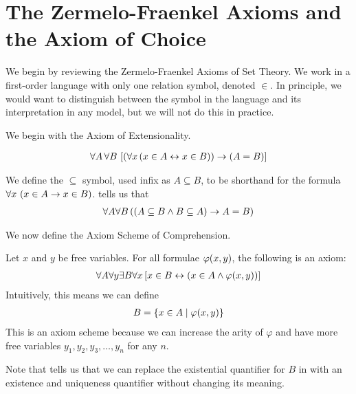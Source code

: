 \section{The Zermelo-Fraenkel Axioms and the Axiom of Choice}

We begin by reviewing the Zermelo-Fraenkel Axioms of Set Theory. We work in a first-order language with only one relation symbol, denoted $\in$. In principle, we would want to distinguish between the symbol in the language and its interpretation in any model, but we will not do this in practice.

We begin with the Axiom of Extensionality.

\begin{baxiom}\label{ZFC:Ext}
    \begin{align*}
        \forall A \, \forall B \, \left[ \left( \forall x \left( x \in A \leftrightarrow x \in B \right) \right) \to \left( A = B \right) \right]
    \end{align*}
\end{baxiom}

We define the $\subseteq$ symbol, used infix as $A \subseteq B$, to be shorthand for the formula $\forall x \, \left( x \in A \to x \in B \right)$.  tells us that
\begin{align*}
    \forall A \forall B \left( \left( A \subseteq B \land B \subseteq A \right) \to A = B \right)
\end{align*}

We now define the Axiom Scheme of Comprehension.

\begin{baxiom}\label{ZFC:Compr}
    Let $x$ and $y$ be free variables. For all formulae $\varphi\!\left( x, y \right)$, the following is an axiom:
    \begin{align*}
        \forall A \forall y \exists B \forall x \left[ x \in B \leftrightarrow \left( x \in A \land \varphi\!\left( x, y \right) \right) \right]
    \end{align*}
    Intuitively, this means we can define
    \begin{align*}
        B = \left\{ x \in A \; \middle\vert \; \varphi\!\left( x, y \right) \right\}
    \end{align*}
    This is an axiom scheme because we can increase the arity of $\varphi$ and have more free variables $y_1, y_2, y_3, \ldots, y_n$ for any $n$.
\end{baxiom}

Note that  tells us that we can replace the existential quantifier for $B$ in  with an existence and uniqueness quantifier without changing its meaning.

